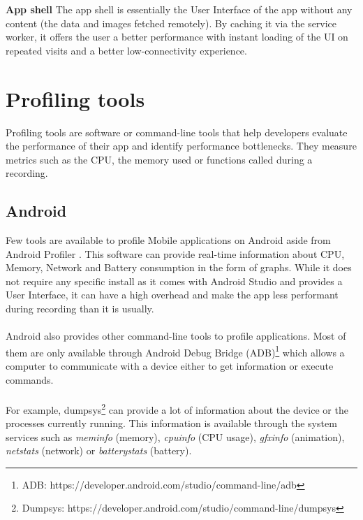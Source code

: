 \documentclass{kththesis}
\begin{document}
\medskip
\textbf{App shell} \newline
The app shell is essentially the User Interface of the app without any content \cite{AppShell_def} (the data and images fetched remotely). By caching it via the service worker, it offers the user a better performance with instant loading of the UI on repeated visits and a better low-connectivity experience.


\section{Profiling tools}

Profiling tools are software or command-line tools that help developers evaluate the performance of their app and identify performance bottlenecks. They measure metrics such as the CPU, the memory used or functions called during a recording.

\subsection{Android}

Few tools are available to profile Mobile applications on Android aside from Android Profiler \cite{nanoscope}. This software can provide real-time information about CPU, Memory, Network and Battery consumption in the form of graphs. While it does not require any specific install as it comes with Android Studio and provides a User Interface, it can have a high overhead \cite{nanoscope} and make the app less performant during recording than it is usually. 

\paragraph{}
Android also provides other command-line tools to profile applications. Most of them are only available through Android Debug Bridge (ADB)\footnote{ADB: https://developer.android.com/studio/command-line/adb} which allows a computer to communicate with a device either to get information or execute commands. 

\paragraph{}
For example, dumpsys\footnote{Dumpsys: https://developer.android.com/studio/command-line/dumpsys} can provide a lot of information about the device or the processes currently running. This information is available through the system services such as \textit{meminfo} (memory), \textit{cpuinfo} (CPU usage), \textit{gfxinfo} (animation), \textit{netstats} (network) or \textit{batterystats} (battery).
\end{document}
